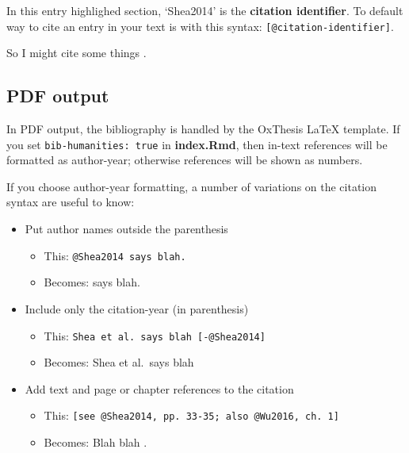 \documentclass[a4paper, twoside]{templates/ociamthesis}
\providecommand{\tightlist}{%
  \setlength{\itemsep}{0pt}\setlength{\parskip}{0pt}}
\begin{document}
In this entry highlighed section, `Shea2014' is the \textbf{citation identifier}.
To default way to cite an entry in your text is with this syntax: \texttt{{[}@citation-identifier{]}}.

So I might cite some things \autocite{Shea2014,Lottridge2012}.

\hypertarget{pdf-output}{%
\subsection{PDF output}\label{pdf-output}}

In PDF output, the bibliography is handled by the OxThesis LaTeX template.
If you set \texttt{bib-humanities:\ true} in \textbf{index.Rmd}, then in-text references will be formatted as author-year; otherwise references will be shown as numbers.

If you choose author-year formatting, a number of variations on the citation syntax are useful to know:

\begin{itemize}
\tightlist
\item
  Put author names outside the parenthesis

  \begin{itemize}
  \tightlist
  \item
    This: \texttt{@Shea2014\ says\ blah.}
  \item
    Becomes: \textcite{Shea2014} says blah.
  \end{itemize}
\item
  Include only the citation-year (in parenthesis)

  \begin{itemize}
  \tightlist
  \item
    This: \texttt{Shea\ et\ al.\ says\ blah\ {[}-@Shea2014{]}}
  \item
    Becomes: Shea et al.~says blah \autocite*{Shea2014}
  \end{itemize}
\item
  Add text and page or chapter references to the citation

  \begin{itemize}
  \tightlist
  \item
    This: \texttt{{[}see\ @Shea2014,\ pp.\ 33-35;\ also\ @Wu2016,\ ch.\ 1{]}}
  \item
    Becomes: Blah blah \autocites[see][pp.~33-35]{Shea2014}[also][ch.~1]{Wu2016}.
  \end{itemize}
\end{itemize}
\end{document}
